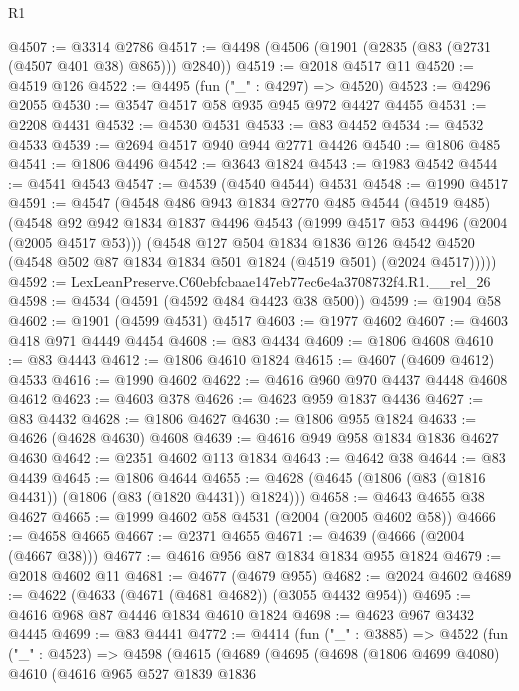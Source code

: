 \begin{lexlean}{R1}
\begin{coremodule}
@4507 := @3314 @2786
@4517 := @4498 (@4506 (@1901 (@2835 (@83 (@2731 (@4507 @401 @38) @865))) @2840))
@4519 := @2018 @4517 @11
@4520 := @4519 @126
@4522 := @4495 (fun ("_" : @4297) => @4520)
@4523 := @4296 @2055
@4530 := @3547 @4517 @58 @935 @945 @972 @4427 @4455
@4531 := @2208 @4431
@4532 := @4530 @4531
@4533 := @83 @4452
@4534 := @4532 @4533
@4539 := @2694 @4517 @940 @944 @2771 @4426
@4540 := @1806 @485
@4541 := @1806 @4496
@4542 := @3643 @1824
@4543 := @1983 @4542
@4544 := @4541 @4543
@4547 := @4539 (@4540 @4544) @4531
@4548 := @1990 @4517
@4591 := @4547
    (@4548
      @486
      @943
      @1834
      @2770
      @485
      @4544
      (@4519 @485)
      (@4548
        @92
        @942
        @1834
        @1837
        @4496
        @4543
        (@1999 @4517 @53 @4496 (@2004 (@2005 @4517 @53)))
        (@4548
          @127
          @504
          @1834
          @1836
          @126
          @4542
          @4520
          (@4548 @502 @87 @1834 @1834 @501 @1824 (@4519 @501) (@2024 @4517)))))
@4592 := LexLeanPreserve.C60ebfcbaae147eb77ec6e4a3708732f4.R1.__rel_26
@4598 := @4534 (@4591 (@4592 @484 @4423 @38 @500))
@4599 := @1904 @58
@4602 := @1901 (@4599 @4531) @4517
@4603 := @1977 @4602
@4607 := @4603 @418 @971 @4449 @4454
@4608 := @83 @4434
@4609 := @1806 @4608
@4610 := @83 @4443
@4612 := @1806 @4610 @1824
@4615 := @4607 (@4609 @4612) @4533
@4616 := @1990 @4602
@4622 := @4616 @960 @970 @4437 @4448 @4608 @4612
@4623 := @4603 @378
@4626 := @4623 @959 @1837 @4436
@4627 := @83 @4432
@4628 := @1806 @4627
@4630 := @1806 @955 @1824
@4633 := @4626 (@4628 @4630) @4608
@4639 := @4616 @949 @958 @1834 @1836 @4627 @4630
@4642 := @2351 @4602 @113 @1834
@4643 := @4642 @38
@4644 := @83 @4439
@4645 := @1806 @4644
@4655 := @4628 (@4645 (@1806 (@83 (@1816 @4431)) (@1806 (@83 (@1820 @4431)) @1824)))
@4658 := @4643 @4655 @38 @4627
@4665 := @1999 @4602 @58 @4531 (@2004 (@2005 @4602 @58))
@4666 := @4658 @4665
@4667 := @2371 @4655
@4671 := @4639 (@4666 (@2004 (@4667 @38)))
@4677 := @4616 @956 @87 @1834 @1834 @955 @1824
@4679 := @2018 @4602 @11
@4681 := @4677 (@4679 @955)
@4682 := @2024 @4602
@4689 := @4622 (@4633 (@4671 (@4681 @4682)) (@3055 @4432 @954))
@4695 := @4616 @968 @87 @4446 @1834 @4610 @1824
@4698 := @4623 @967 @3432 @4445
@4699 := @83 @4441
@4772 := @4414
    (fun ("_" : @3885) =>
    @4522
      (fun ("_" : @4523) =>
      @4598
        (@4615
          (@4689
            (@4695
              (@4698
                (@1806 @4699 @4080)
                @4610
                (@4616
                  @965
                  @527
                  @1839
                  @1836

\end{coremodule}
\end{lexlean}
